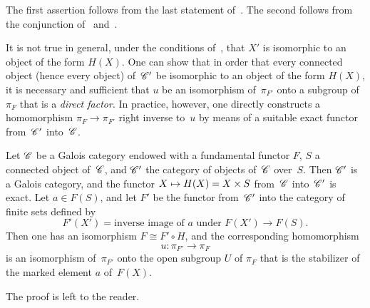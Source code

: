 The first assertion follows from the last statement
of~. The second follows from the conjunction
of~ and~.

\begin{remark}
\label{V.6.12}
It is not true in general, under the conditions
of~, that $X'$ is isomorphic to an object of the form
$H(X)$. One can show that in order that every connected object (hence every
object) of~$\cal{C}'$ be isomorphic to an object of the form $H(X)$,
it is necessary and sufficient that $u$ be an isomorphism of~$\pi_{F'}$ onto a
subgroup of~$\pi_F$ that is a \emph{direct factor}. In practice, however,
one directly constructs a homomorphism $\pi_F\to\pi_{F'}$ right inverse
to~$u$ by means of a suitable exact functor
from~$\cal{C'}$ into~$\cal{C}$.
\end{remark}

\begin{proposition}
\label{V.6.13}
Let $\cal{C}$ be a Galois category endowed with a fundamental
functor $F$, $S$ a connected object of~$\cal{C}$, and $\cal{C}'$ the
category of objects of~$\cal{C}$ over~$S$. Then
$\cal{C'}$ is a Galois category, and the functor $X\mto
H(X)=X\times S$ from~$\cal{C}$ into~$\cal{C}'$ is exact. Let $a\in
F(S)$, and let $F'$ be the functor from~$\cal{C}'$ into the category
of finite sets defined by
$$
F'(X')=\text{inverse image of~$a$ under }F(X')\to F(S).
$$
Then one has an isomorphism $F\cong F'\circ H$, and the
corresponding homomorphism
$$
u:\pi_{F'}\to \pi_F
$$
is an isomorphism of~$\pi_{F'}$ onto the open subgroup $U$ of
$\pi_{F}$ that is the stabilizer of the marked element $a$ of~$F(X)$.
\end{proposition}

The proof is left to the reader.

